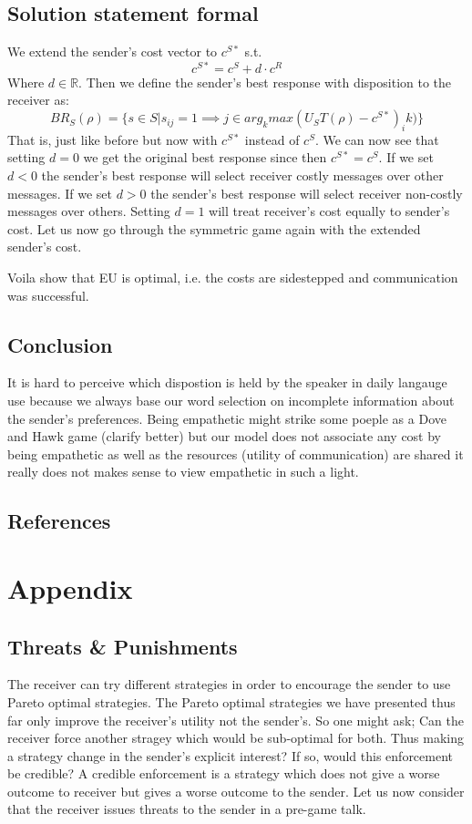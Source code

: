 \documentclass[10]{article}
\begin{document}
\subsection{Solution statement formal}
We extend the sender's cost vector to $c^{S*}$ s.t. %
$$c^{S*}=c^{S} + d \cdot c^{R}$$
Where $d \in \mathbb{R}$. Then we define the sender's best response with disposition to the receiver as:
\begin{equation*}
BR_S(\rho)=\{s\in S | s_{ij}=1\implies j \in arg_kmax(U_S T(\rho)-c^{S*})_ik)\}
\end{equation*}
That is, just like before but now with $c^{S*}$ instead of $c^{S}$. We can now see that setting $d=0$ we get the original best response since then $c^{S*}=c^{S}$.
If we set $d<0$ the sender's best response will select receiver costly messages over other messages. If we set $d>0$ the sender's best response will select receiver non-costly messages over others. Setting $d=1$ will treat receiver's cost equally to sender's cost. Let us now go through the symmetric game again with the extended sender's cost.



Voila show that EU is optimal, i.e. the costs are sidestepped and communication was successful.

\subsection{Conclusion}
It is hard to perceive which dispostion is held by the speaker in daily langauge use because we always base our word selection on incomplete information about the sender's preferences.
Being empathetic might strike some poeple as a Dove and Hawk game (clarify better) but our model does not associate any cost by being empathetic as well as the resources (utility of communication) are shared it really does not makes sense to view empathetic in such a light.
\subsection{References}

\section{Appendix}
\subsection{Threats \& Punishments}
The receiver can try different strategies in order to encourage the sender to use Pareto optimal strategies. The Pareto optimal strategies we have presented thus far only improve the receiver's utility not the sender's. So one might ask; Can the receiver force another stragey which would be sub-optimal for both. Thus making a strategy change in the sender's explicit interest? If so, would this enforcement be credible? A credible enforcement is a strategy which does not give a worse outcome to receiver but gives a worse outcome to the sender. Let us now consider that the receiver issues threats to the sender in a pre-game talk. %
\end{document}
